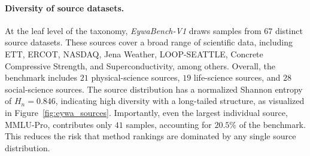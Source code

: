 \documentclass{llmxive}
\begin{document}
{%
\begin{table}[!htbp]
\centering
{}
\caption{Detailed composition of \textit{EywaBench-V1} by parent domain, sub-domain, modality, and source dataset. 
For each sub-domain, we report the total number of samples, the number of natural-language, time-series, and tabular samples, and the number of distinct source datasets. 
The total number of unique source datasets is $67$, which is smaller than the sum of per-sub-domain source counts because each source dataset may contribute multiple samples.}
\label{tab:eywa_subdomain}
\end{table}


\paragraph{Diversity of source datasets.}
At the leaf level of the taxonomy, \textit{EywaBench-V1} draws samples from $67$ distinct source datasets. These sources cover a broad range of scientific data, including ETT, ERCOT, NASDAQ, Jena Weather, LOOP-SEATTLE, Concrete Compressive Strength, and Superconductivity, among others. Overall, the benchmark includes $21$ physical-science sources, $19$ life-science sources, and $28$ social-science sources. The source distribution has a normalized Shannon entropy of $H_n{=}0.846$, indicating high diversity with a long-tailed structure, as visualized in Figure~\ref{fig:eywa_sources}. Importantly, even the largest individual source, MMLU-Pro, contributes only $41$ samples, accounting for $20.5\%$ of the benchmark. This reduces the risk that method rankings are dominated by any single source distribution.


}
\end{document}
